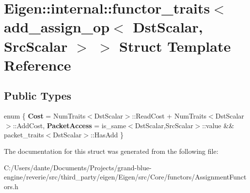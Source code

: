 \hypertarget{struct_eigen_1_1internal_1_1functor__traits_3_01add__assign__op_3_01_dst_scalar_00_01_src_scalar_01_4_01_4}{}\section{Eigen\+::internal\+::functor\+\_\+traits$<$ add\+\_\+assign\+\_\+op$<$ Dst\+Scalar, Src\+Scalar $>$ $>$ Struct Template Reference}
\label{struct_eigen_1_1internal_1_1functor__traits_3_01add__assign__op_3_01_dst_scalar_00_01_src_scalar_01_4_01_4}
\subsection*{Public Types}
\begin{DoxyCompactItemize}
\item 
\mbox{\label{struct_eigen_1_1internal_1_1functor__traits_3_01add__assign__op_3_01_dst_scalar_00_01_src_scalar_01_4_01_4_a753a5d58b4f1d29ed5c030d7d8e58408}} 
enum \{ {\bfseries Cost} = Num\+Traits$<$Dst\+Scalar$>$\+::Read\+Cost + Num\+Traits$<$Dst\+Scalar$>$\+::Add\+Cost, 
{\bfseries Packet\+Access} = is\+\_\+same$<$Dst\+Scalar,Src\+Scalar$>$\+::value \&\& packet\+\_\+traits$<$Dst\+Scalar$>$\+::Has\+Add
 \}
\end{DoxyCompactItemize}


The documentation for this struct was generated from the following file\+:\begin{DoxyCompactItemize}
\item 
C\+:/\+Users/dante/\+Documents/\+Projects/grand-\/blue-\/engine/reverie/src/third\+\_\+party/eigen/\+Eigen/src/\+Core/functors/Assignment\+Functors.\+h\end{DoxyCompactItemize}
